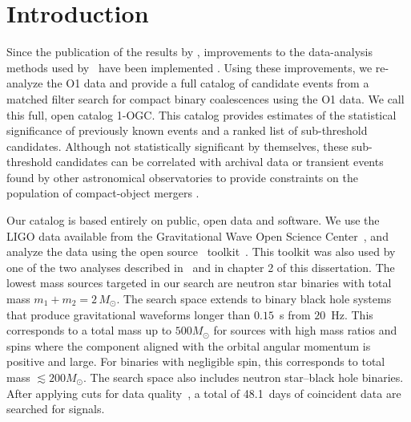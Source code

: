 
\newcommand{\chieff}{\ensuremath{\chi_{\mathrm{eff}}}}
\newcommand{\rankingstat}{\ensuremath{\tilde{\rho}_c}}
\newcommand{\tdr}{\ensuremath{\mathrm{TDR}}}
\newcommand{\far}{\ensuremath{\mathcal{F}}}
\newcommand{\tar}{\ensuremath{\mathcal{T}}}
\newcommand{\msun}{\ensuremath{\mathrm{M}_{\odot}}}
\newcommand{\pastro}{\ensuremath{P_{\mathrm{astro}}}}
\newcommand{\release}{\texttt{\url{www.github.com/gwastro/1-ogc}}}

\section{Introduction}
\label{sec:intro}
Since the publication of the results by \cite{TheLIGOScientific:2016pea,Abbott:2016ymx}, improvements to the data-analysis methods used by~\citep{TheLIGOScientific:2016qqj} have been implemented \citep{Nitz:2017svb,Nitz:2017lco,DalCanton:2017ala}.  Using these improvements, we re-analyze the O1 data and provide a full catalog of candidate events from a matched filter search for compact binary coalescences using the O1 data. We call this full, open catalog 1-OGC. This catalog provides estimates of the statistical significance of previously known events and a ranked list of sub-threshold candidates. Although not statistically significant by themselves, these sub-threshold candidates can be correlated with archival data or transient events found by other astronomical observatories to provide constraints on the population of compact-object mergers \citep{Ashton:2017ykh, Burns:2018pcl}.

Our catalog is based entirely on public, open data and software. We use the LIGO data available from the Gravitational Wave Open Science Center~\citep{Vallisneri:2014vxa}, and analyze the data using the open source \pycbc{}\ toolkit~\citep{Usman:2015kfa,Canton:2014ena,pycbc-github}. This toolkit was also used by one of the two analyses described in~\cite{TheLIGOScientific:2016qqj} and in chapter 2 of this dissertation. The lowest mass sources targeted in our search are neutron star binaries with total mass $m_1 + m_2 = 2\, M_\odot$. The search space extends to binary black hole systems that produce gravitational waveforms longer than $0.15$~s from $20$~Hz. This corresponds to a total mass up to $500 M_{\odot}$ for sources with high mass ratios and spins where the component aligned with the orbital angular momentum is positive and large. For binaries with negligible spin, this corresponds to total mass $\lesssim 200 M_{\odot}$. The search space also includes neutron star--black hole binaries. After applying cuts for data quality~\citep{TheLIGOScientific:2016zmo,TheLIGOScientific:2017lwt}, a total of 48.1~days of coincident data are searched for signals.

